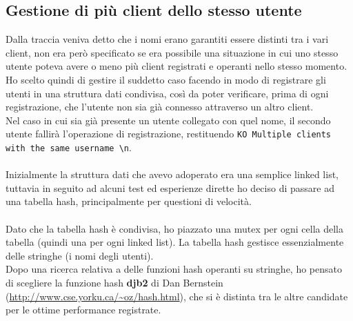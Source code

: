 \subsection{Gestione di più client dello stesso utente}
\begin{flushleft}

Dalla traccia veniva detto che i nomi erano garantiti essere distinti tra i vari client, non era però specificato se era possibile una situazione in cui uno stesso utente poteva avere o meno più client registrati e operanti nello stesso momento.\\

Ho scelto quindi di gestire il suddetto caso facendo in modo di registrare gli utenti in una struttura dati condivisa, così da poter verificare, prima di ogni registrazione, che l'utente non sia già connesso attraverso un altro client.\\

Nel caso in cui sia già presente un utente collegato con quel nome, il secondo utente fallirà l'operazione di registrazione, restituendo \texttt{KO Multiple clients with the same username \textbackslash n}.\\~\\
Inizialmente la struttura dati che avevo adoperato era una semplice linked list, tuttavia in seguito ad alcuni test ed esperienze dirette ho deciso di passare ad una tabella hash, principalmente per questioni di velocità. 
\\~\\
Dato che la tabella hash è condivisa, ho piazzato una mutex per ogni cella della tabella (quindi una per ogni linked list).
La tabella hash gestisce essenzialmente delle stringhe (i nomi degli utenti).\\ Dopo una ricerca relativa a delle funzioni hash operanti su stringhe, ho pensato di scegliere la funzione hash \textbf{djb2} di Dan Bernstein (\url{http://www.cse.yorku.ca/~oz/hash.html}), che si è distinta tra le altre candidate per le ottime performance registrate.
 

\end{flushleft}

\newpage

